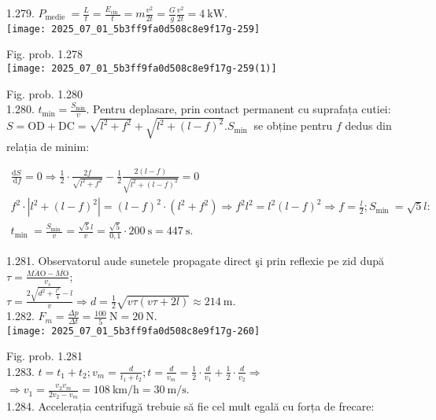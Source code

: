 1.279. $P_{\text {medie }}=\frac{L}{t}=\frac{E_{\text {cin }}}{t}=m \frac{v^{2}}{2 t}=\frac{G}{g} \frac{v^{2}}{2 t}=4 \mathrm{~kW}$.\\
\texttt{[image: 2025\_07\_01\_5b3ff9fa0d508c8e9f17g-259]}

Fig. prob. 1.278\\
\texttt{[image: 2025\_07\_01\_5b3ff9fa0d508c8e9f17g-259(1)]}

Fig. prob. 1.280\\
1.280. $t_{\min }=\frac{S_{\min }}{v}$. Pentru deplasare, prin contact permanent cu suprafața cutiei: $S=\mathrm{OD}+\mathrm{DC}=\sqrt{l^{2}+f^{2}}+\sqrt{l^{2}+(l-f)^{2}} . S_{\text {min }}$ se obține pentru $f$ dedus din relația de minim:

$$
\begin{gathered}
\frac{\mathrm{d} S}{\mathrm{~d} f}=0 \Rightarrow \frac{1}{2} \cdot \frac{2 f}{\sqrt{l^{2}+f^{2}}}-\frac{1}{2} \frac{2(l-f)}{\sqrt{l^{2}+(l-f)^{2}}}=0 \\
f^{2} \cdot\left|l^{2}+(l-f)^{2}\right|=(l-f)^{2} \cdot\left(l^{2}+f^{2}\right) \Rightarrow f^{2} l^{2}=l^{2}(l-f)^{2} \Rightarrow f=\frac{l}{2} ; S_{\text {min }}=\sqrt{5} l: \\
t_{\text {min }}=\frac{S_{\text {min }}}{v}=\frac{\sqrt{5} l}{v}=\frac{\sqrt{5}}{0,1} \cdot 200 \mathrm{~s}=447 \mathrm{~s} .
\end{gathered}
$$

1.281. Observatorul aude sunetele propagate direct şi prin reflexie pe zid după $\tau=\frac{\overline{M A \mathrm{O}}-\overline{M \mathrm{O}}}{v_{s}}$;\\
$\tau=\frac{2 \sqrt{d^{2}+\frac{l^{2}}{4}}-l}{v} \Rightarrow d=\frac{1}{2} \sqrt{v \tau(v \tau+2 l)} \approx 214 \mathrm{~m}$.\\
1.282. $F_{m}=\frac{\Delta p}{\Delta t}=\frac{100}{5} \mathrm{~N}=20 \mathrm{~N}$.\\
\texttt{[image: 2025\_07\_01\_5b3ff9fa0d508c8e9f17g-260]}

Fig. prob. 1.281\\
1.283. $t=t_{1}+t_{2} ; v_{m}=\frac{d}{t_{1}+t_{2}} ; t=\frac{d}{v_{m}}=\frac{1}{2} \cdot \frac{d}{v_{1}}+\frac{1}{2} \cdot \frac{d}{v_{2}} \Rightarrow$ $\Rightarrow v_{1}=\frac{v_{2} v_{m}}{2 v_{2}-v_{m}}=108 \mathrm{~km} / \mathrm{h}=30 \mathrm{~m} / \mathrm{s}$.\\
1.284. Accelerația centrifugă trebuie să fie cel mult egală cu forța de frecare:

